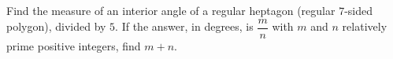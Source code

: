 Find the measure of an interior angle of a regular heptagon (regular $7$-sided polygon), divided by $5$. If the answer, in degrees, is $\dfrac mn$ with $m$ and $n$ relatively prime positive integers, find $m+n$.
